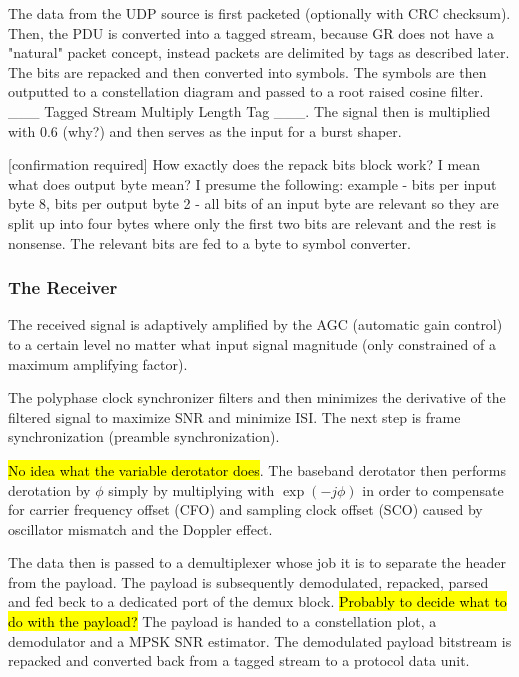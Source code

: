 \documentclass{article}
\begin{document}
The data from the UDP source is first packeted (optionally with CRC checksum). Then, the PDU is converted into a tagged stream, because GR does not have a "natural" packet concept, instead packets are delimited by tags as described later. The bits are repacked and then converted into symbols. The symbols are then outputted to a constellation diagram and passed to a root raised cosine filter. \_\_\_ Tagged Stream Multiply Length Tag \_\_\_. The signal then is multiplied with 0.6 (why?) and then serves as the input for a burst shaper.

\bigskip

\color{blue}
[confirmation required] How exactly does the repack bits block work? I mean what does output byte mean? I presume the following: example - bits per input byte 8, bits per output byte 2 - all bits of an input byte are relevant so they are split up into four bytes where only the first two bits are relevant and the rest is nonsense. The relevant bits are fed to a byte to symbol converter.
\color{black}

\subsubsection{The Receiver}

The received signal is adaptively amplified by the AGC (automatic gain control) to a certain level no matter what input signal magnitude (only constrained of a maximum amplifying factor).

\bigskip

The polyphase clock synchronizer filters and then minimizes the derivative of the filtered signal to maximize SNR and minimize ISI. The next step is frame synchronization (preamble synchronization). 

\bigskip

\hl{No idea what the variable derotator does}. The baseband derotator then performs derotation by $\phi$ simply by multiplying with $\exp(-j\phi)$ in order to compensate for carrier frequency offset (CFO) and sampling clock offset (SCO) caused by oscillator mismatch and the Doppler effect. 

\bigskip

The data then is passed to a demultiplexer whose job it is to separate the header from the payload. The payload is subsequently demodulated, repacked, parsed and fed beck to a dedicated port of the demux block. \hl{Probably to decide what to do with the payload?} The payload is handed to a constellation plot, a demodulator and a MPSK SNR estimator. The demodulated payload bitstream is repacked and converted back from a tagged stream to a protocol data unit.
\end{document}
